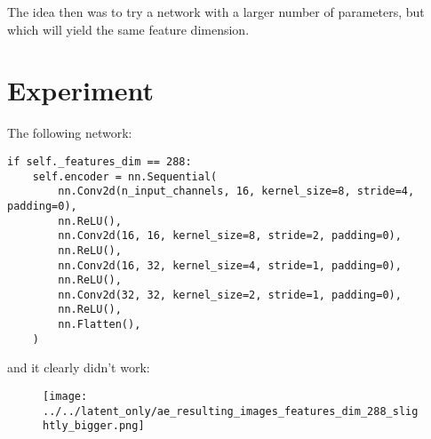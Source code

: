 \documentclass{article}
\begin{document}
The idea then was to try a network with a larger number of parameters,
but which will yield the same feature dimension.

\section{Experiment}
The following network:
\begin{verbatim}
if self._features_dim == 288:
    self.encoder = nn.Sequential(
        nn.Conv2d(n_input_channels, 16, kernel_size=8, stride=4, padding=0),
        nn.ReLU(),
        nn.Conv2d(16, 16, kernel_size=8, stride=2, padding=0),
        nn.ReLU(),
        nn.Conv2d(16, 32, kernel_size=4, stride=1, padding=0),
        nn.ReLU(),
        nn.Conv2d(32, 32, kernel_size=2, stride=1, padding=0),
        nn.ReLU(),
        nn.Flatten(),
    )

\end{verbatim}

and it clearly didn't work:
\begin{figure}[htpb]
		\centering
		\texttt{[image: ../../latent\_only/ae\_resulting\_images\_features\_dim\_288\_slightly\_bigger.png]}
		\caption{}
		\label{fig:}
\end{figure}
\end{document}
